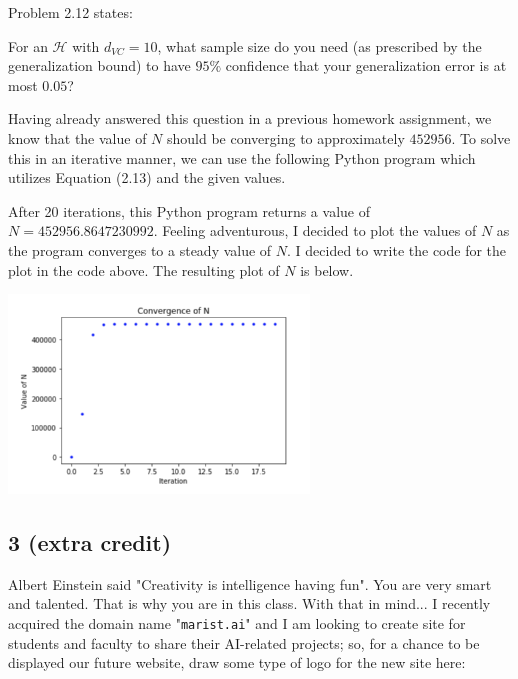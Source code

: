 \documentclass[a4paper]{article}
\begin{document}
Problem 2.12 states:
\begin{displayquote}
For an $\mathcal{H}$ with $d_{VC} = 10$, what sample size do you 
need (as prescribed by the generalization bound) to have $95\%$ confidence that your 
generalization error is at most $0.05$?
\end{displayquote}
Having already answered this question in a previous homework assignment, we know that the value 
of $N$ should be converging to approximately $452956$.  To solve this in an iterative manner, 
we can use the following Python program which utilizes Equation (2.13) and the given values.

After 20 iterations, this Python program returns a value of $N = 452956.8647230992$.  Feeling 
adventurous, I decided to plot the values of $N$ as the program converges to a steady value of 
$N$.  I decided to write the code for the plot in the code above.  The resulting plot of $N$ 
is below.
\begin{center}
    \includegraphics[width=0.6\textwidth]{NConvergence.jpg}
\end{center}


\subsection{3 (extra credit)} Albert Einstein said "Creativity is intelligence having fun".  You 
are very smart and talented.  That is why you are in this class.  With that in mind... I recently 
acquired the domain name  "\verb|marist.ai|" and I am looking to create site for students and 
faculty to share their AI-related projects; so, for a chance to be displayed our future website, 
draw some type of logo for the new site here:
\begin{center}
    \fbox{\begin{minipage}{2.5in}\hfill\vspace{2.5in}\end{minipage}}
\end{center}
\end{document}
